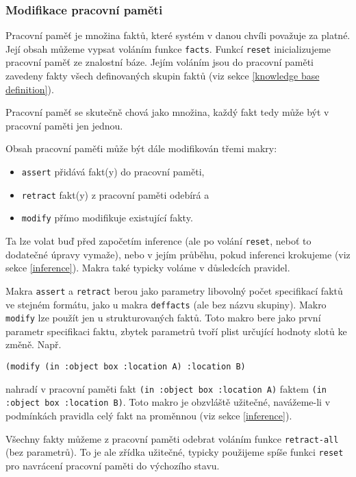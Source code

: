 \subsubsection{Modifikace pracovní paměti}
\label{modifikace}

Pracovní paměť je množina faktů, které systém v danou chvíli považuje za platné.
Její obsah můžeme vypsat voláním funkce \verb|facts|. Funkcí \verb|reset|
inicializujeme pracovní paměť ze znalostní báze. Jejím voláním jsou do pracovní
paměti zavedeny fakty všech definovaných skupin faktů (viz sekce
\ref{knowledge base definition}).

\begin{framed}
Pracovní paměť se skutečně chová jako množina, každý fakt tedy může být v
pracovní paměti jen jednou.
\end{framed}

Obsah pracovní paměťi může být dále modifikován třemi makry:
\begin{itemize}
  \item \verb|assert| přidává fakt(y) do pracovní paměti,
  \item \verb|retract| fakt(y) z pracovní paměti odebírá a
  \item \verb|modify| přímo modifikuje existující fakty.
\end{itemize}
Ta lze volat buď před započetím inference (ale po volání \verb|reset|, neboť to
dodatečné úpravy vymaže), nebo v jejím průběhu, pokud inferenci krokujeme (viz
sekce \ref{inference}). Makra také typicky voláme v důsledcích pravidel.

Makra \verb|assert| a \verb|retract| berou jako parametry libovolný počet
specifikací faktů ve stejném formátu, jako u makra \verb|deffacts| (ale bez
názvu skupiny). Makro \verb|modify| lze použít jen u strukturovaných faktů. Toto
makro bere jako první parametr specifikaci faktu, zbytek parametrů tvoří plist
určující hodnoty slotů ke změně. Např.
\begin{verbatim}
(modify (in :object box :location A) :location B)
\end{verbatim}
nahradí v pracovní paměti fakt \verb|(in :object box :location A)| faktem
\verb|(in :object box :location B)|.
Toto makro je obzvláště užitečné, navážeme-li v podmínkách pravidla celý fakt na
proměnnou (viz sekce \ref{inference}).

Všechny fakty můžeme z pracovní paměti odebrat voláním funkce \verb|retract-all|
(bez parametrů). To je ale zřídka užitečné, typicky použijeme spíše funkci
\verb|reset| pro navrácení pracovní paměti do výchozího stavu.
